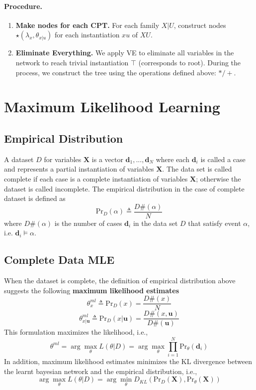 \documentclass[11pt]{article}
\newcommand{\bd}{\mathbf{d}}
\newcommand{\bu}{\mathbf{u}}
\newcommand{\pr}{\mathrm{Pr}}
\begin{document}
\paragraph{Procedure.}
\begin{enumerate}
	\item \textbf{Make nodes for each CPT.} For each family $X|U$, construct nodes $\star (\lambda_x, \theta_{x | u} )$ for each instantiation $xu$ of $XU$. 
	\item \textbf{Eliminate Everything.} We apply VE to eliminate all variables in the network to reach trivial instantiation $\top$ (corresponds to root). During the process, we construct the tree using the operations defined above: $* / +$. 
\end{enumerate}

\section{Maximum Likelihood Learning}
\subsection{Empirical Distribution}
A dataset $D$ for variables $\mathbf X$ is a vector $\bd_1, ..., \bd_N$ where each $\bd_i$ is called a case and represents a partial instantiation of variables $\mathbf X$. The data set is called complete if each case is a complete instantiation of variables $\mathbf X$; otherwise the dataset is called incomplete. The empirical distribution in the case of complete dataset is defined as
\begin{equation}
	\pr_D (\alpha ) \triangleq \frac{D\#(\alpha)}{N}
\end{equation}
where $D\#(\alpha)$ is the number of cases $\mathbf d_i$ in the data set $D$ that satisfy event $\alpha$, i.e.  $\bd_i \vDash \alpha$. 

\subsection{Complete Data MLE\label{sec:compete data mle}}
When the dataset is complete, the definition of empirical distribution above suggests the following \textbf{maximum likelihood estimates}
\begin{equation}
	\theta^{ml}_x \triangleq \pr_D(x) = \frac{D\#(x)}{N} 
\end{equation}
\begin{equation}
	\theta^{ml}_{x|\bu} \triangleq \pr_D (x | \bu) = \frac{D\# (x, \bu)}{D\# (\bu)}
\end{equation}
This formulation maximizes the likelihood, i.e., 
\begin{equation}
	\theta^{ml} = \arg\max _\theta L(\theta |D ) = \arg\max _\theta \prod_{i = 1}^N \pr_\theta (\bd_i)
\end{equation}
In addition, maximum likelihood estimates minimizes the KL divergence between the learnt bayesian network and the empirical distribution, i.e., 
\begin{equation}
	\arg\max_\theta L(\theta| D) = \arg\min_\theta D_{KL} (\pr_D (\mathbf X), \pr_\theta (\mathbf X))
\end{equation}
\end{document}
